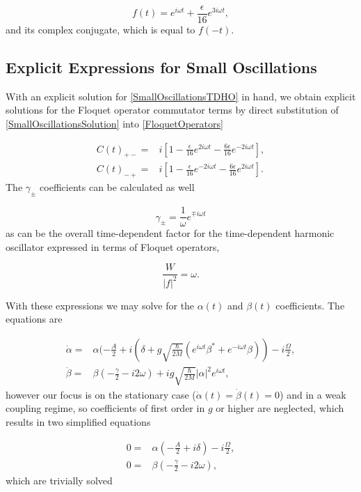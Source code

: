 \documentclass[reprint, amsmath,amssymb, aps,pra]{revtex4-1}
\begin{document}
\begin{equation}\label{SmallOscillationsSolution}
f(t)=  e^{i\omega t} + \frac{\epsilon}{16} e^{3i\omega t},
\end{equation} and its complex conjugate, which is equal to $f(-t)$. 

\subsection{Explicit Expressions for Small Oscillations}

	With an explicit solution for \eqref{SmallOscillationsTDHO} in hand, we obtain explicit solutions for the Floquet operator commutator terms by direct substitution of \eqref{SmallOscillationsSolution} into \eqref{FloquetOperators} \cite{TesisMaestria}

\begin{align}
C(t)_{+-} =& i [1 -\frac{\epsilon}{16}e^{2i\omega t}-\frac{6\epsilon}{16}e^{-2i\omega t}],\\
C(t)_{-+} =& i [1 -\frac{\epsilon}{16}e^{-2i\omega t}-\frac{6\epsilon}{16}e^{2i\omega t}].
\end{align} The $\gamma_{\pm}$ coefficients can be calculated as well

\begin{equation}
\gamma_\pm= \frac{1}{\omega}e^{\mp i\omega t}
\end{equation} as can be the overall time-dependent factor for the time-dependent harmonic oscillator expressed in terms of Floquet operators,

\begin{equation}
\frac{W}{|f|^2} = \omega.
\end{equation} 

With these expressions we may solve for the $\alpha(t)$ and $\beta(t)$ coefficients. The equations are

\begin{align}
\dot{\alpha} =& \alpha(-\frac{A}{2}+i(\delta+g\sqrt{\frac{\hbar}{2M}}(e^{i\omega t} \beta^* + e^{-i\omega t} \beta))-i\frac{\Omega}{2},\\
\dot{\beta} =& \beta(-\frac{\gamma}{2}-i 2\omega)+ig\sqrt{\frac{\hbar}{2M}}|\alpha|^2e^{i\omega t},
\end{align}
however our focus is on the stationary case
($\dot{\alpha}(t)=\dot{\beta}(t)=0$) and in a weak coupling regime, so
coefficients of first order in $g$ or higher are neglected, which
results in two simplified equations

\begin{align}
0 =& \alpha(-\frac{A}{2}+i\delta)-i\frac{\Omega}{2},\\
0 =& \beta(-\frac{\gamma}{2}-i 2\omega),
\end{align} which are trivially solved 
\end{document}
